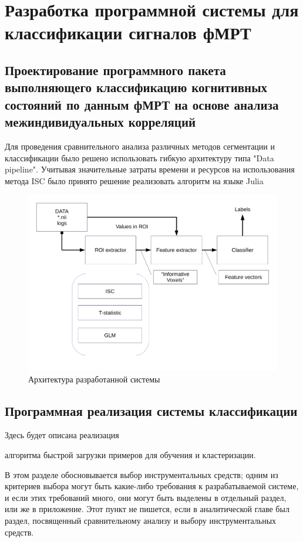 \chapter{Разработка программной системы для классификации сигналов фМРТ}


\section{Проектирование программного пакета выполняющего классификацию когнитивных состояний по данным фМРТ на основе анализа межиндивидуальных корреляций}

Для проведения сравнительного анализа различных методов сегментации и классификации было решено использовать гибкую архитектуру типа "Data pipeline". Учитывая значительные затраты времени и ресурсов на использования метода ISC было принято решение реализовать алгоритм на языке Julia\cite{bezanson2017julia}
\begin{figure}%
	\begin{center}
		\includegraphics[width=.7\columnwidth]{./img/arch.pdf}%
	\end{center}
	\caption{Архитектура разработанной системы}%
	\label{pic:arch}%
\end{figure}



\section{Программная реализация системы классификации}
\begin{annotation}
	Здесь будет описана реализация
	\begin{compactitem}
		\item алгоритма быстрой загрузки примеров для обучения и кластеризации.
		
	\end{compactitem}

\end{annotation}
В этом разделе обосновывается выбор инструментальных средств; одним из критериев выбора могут быть какие-либо требования к разрабатываемой системе, и если этих требований много, они могут быть выделены в отдельный раздел, или же в приложение. Этот пункт не пишется, если в аналитической главе был раздел, посвященный сравнительному анализу и выбору инструментальных средств.




